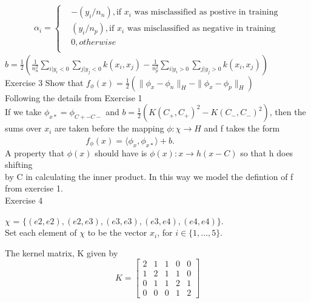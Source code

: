 \documentclass[18pt]{article}
\begin{document}
\begin{flushleft}
\begin{align}
    \alpha_i=  \left\{
    \begin{aligned}
                &-(y_i/n_n),\text{if $x_i$ was misclassified as postive in training}\\
                & (y_i/n_p),\text{if $x_i$ was misclassified as negative in training}\\
                & 0, otherwise\\
    \end{aligned}
    \right.
\end{align}
\hspace{1.2cm} $b=\frac{1}{2}\left(\frac{1}{n^2_n} \sum_{i|y_i<0} \sum_{j|y_j<0} k(x_i,x_j)-\frac{1}{n^2_p}\sum_{i|y_i>0}\sum_{j|y_j>0} k(x_i,x_j)\right)$\\
\vspace{.4cm}
Exercise 3 \hspace{.5cm}   Show that $f_\phi(x) =\frac{1}{2}\left(\parallel \phi_x-\phi_{n}\parallel_H-\parallel \phi_x-\phi_{p}\parallel_H\right)$\\
\vspace{.4cm}
Following the details from Exercise 1\\
\vspace{.4cm}
If we take $\phi_{x*}=\phi_{C+-C-}$ and $b=\frac{1}{2}\left(K(C_{+},C_{+})^2-K \left(C_{-},C_{-}\right)^2\right)$, then
the sums over $x_i$ are taken before the mapping $\phi:\chi \to H$ and f takes the form\\
\vspace{.4cm}
$\hspace{4cm} f_\phi(x)=\langle \phi_x, \phi_{x*} \rangle+b$.\\
\vspace{.4cm}
A property that $\phi(x)$ should have is $\phi(x):x\rightarrow h(x-C)$ so that h does shifting\\
by C in calculating the inner product. In this way we model the defintion of f from exercise 1.\\
\pagebreak
Exercise 4

$\chi$ = $\{(e2,e2),(e2,e3),(e3,e3),(e3,e4),(e4,e4)\}$.\\

Set each element of $\chi$ to be the vector $x_i$, for $i \in \{1,\dots,5\}$.\\
\end{flushleft}
The kernel matrix, K given by
$$
K =
     {\begin{bmatrix}
    2&1&1&0&0 \\
    1&2&1&1&0 \\
    0&1&1&2&1 \\
    0&0&0&1&2 
    \end{bmatrix}}
$$
\end{document}
